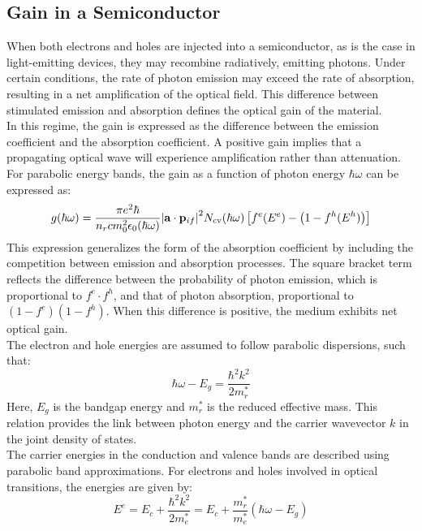 \subsection{Gain in a Semiconductor}
When both electrons and holes are injected into a semiconductor, as is the case in light-emitting devices, they may recombine radiatively, emitting photons. Under certain conditions, the rate of photon emission may exceed the rate of absorption, resulting in a net amplification of the optical field. This difference between stimulated emission and absorption defines the optical gain of the material.\\
In this regime, the gain is expressed as the difference between the emission coefficient and the absorption coefficient. A positive gain implies that a propagating optical wave will experience amplification rather than attenuation.\\
For parabolic energy bands, the gain as a function of photon energy \( \hbar \omega \) can be expressed as:
\begin{equation}
	g(\hbar \omega) = \frac{\pi e^2 \hbar}{n_r c m_0^2 \epsilon_0 (\hbar \omega)} \abs{\vb{a} \cdot \vb{p}_{if}}^2 N_{\text{cv}}(\hbar \omega)
	\left[ f^e(E^e) - \left(1 - f^h(E^h)\right) \right]
\end{equation}
This expression generalizes the form of the absorption coefficient by including the competition between emission and absorption processes. The square bracket term reflects the difference between the probability of photon emission, which is proportional to \( f^e \cdot f^h \), and that of photon absorption, proportional to \( (1 - f^e)(1 - f^h) \). When this difference is positive, the medium exhibits net optical gain.\\
The electron and hole energies are assumed to follow parabolic dispersions, such that:
\begin{equation}
	\hbar \omega - E_g = \frac{\hbar^2 k^2}{2 m_r^*}
\end{equation}
Here, \( E_g \) is the bandgap energy and \( m_r^* \) is the reduced effective mass. This relation provides the link between photon energy and the carrier wavevector \( k \) in the joint density of states.\\
The carrier energies in the conduction and valence bands are described using parabolic band approximations. For electrons and holes involved in optical transitions, the energies are given by:
\begin{equation}
	E^e = E_c + \frac{\hbar^2 k^2}{2 m_e^*} = E_c + \frac{m_r^*}{m_e^*}(\hbar \omega - E_g)
\end{equation}
